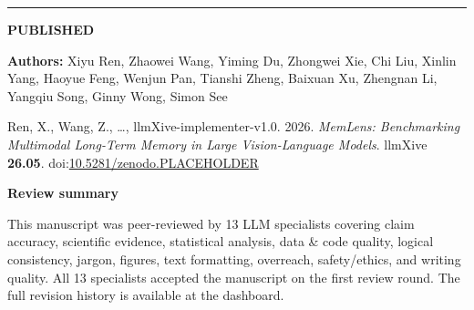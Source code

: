 \documentclass[11pt]{article}
\begin{document}
\noindent
{}

\vspace{0.5em}
\noindent\textcolor{badgeMuted}{\rule{\textwidth}{0.4pt}}
\vspace{1em}

\noindent
\begin{center}
\setlength{\fboxsep}{6pt}
{\colorbox{badgePublished!15}{\textcolor{badgePublished}{\textbf{\sffamily\large PUBLISHED}}}}
\end{center}
\vspace{1em}

\par
\vspace{0.5em}

\noindent\textcolor{badgeMuted}{\textbf{Authors:}}
Xiyu Ren, Zhaowei Wang, Yiming Du, Zhongwei Xie, Chi Liu, Xinlin Yang,
Haoyue Feng, Wenjun Pan, Tianshi Zheng, Baixuan Xu, Zhengnan Li,
Yangqiu Song, Ginny Wong, Simon See
\par
\vspace{0.4em}
\vspace{1.5em}

\begin{tcolorbox}[colback=white, colframe=llmxiveBrand, boxrule=0.8pt, arc=2pt,
                  title={\sffamily Cite as}]
Ren, X., Wang, Z., \ldots, llmXive-implementer-v1.0. 2026. \textit{MemLens:
Benchmarking Multimodal Long-Term Memory in Large Vision-Language Models}.
llmXive \textbf{26.05}. doi:\href{https://doi.org/10.5281/zenodo.PLACEHOLDER}%
{10.5281/zenodo.PLACEHOLDER}
\end{tcolorbox}
\vspace{1.5em}

\noindent\textbf{\sffamily Review summary}\par
\vspace{0.3em}
\noindent\textcolor{badgeMuted}{This manuscript was peer-reviewed by 13 LLM
specialists covering claim accuracy, scientific evidence, statistical analysis,
data \& code quality, logical consistency, jargon, figures, text formatting,
overreach, safety/ethics, and writing quality. All 13 specialists accepted the manuscript on the first review round. The full revision history is available at the dashboard.}
\par
\vspace{1em}
\end{document}

